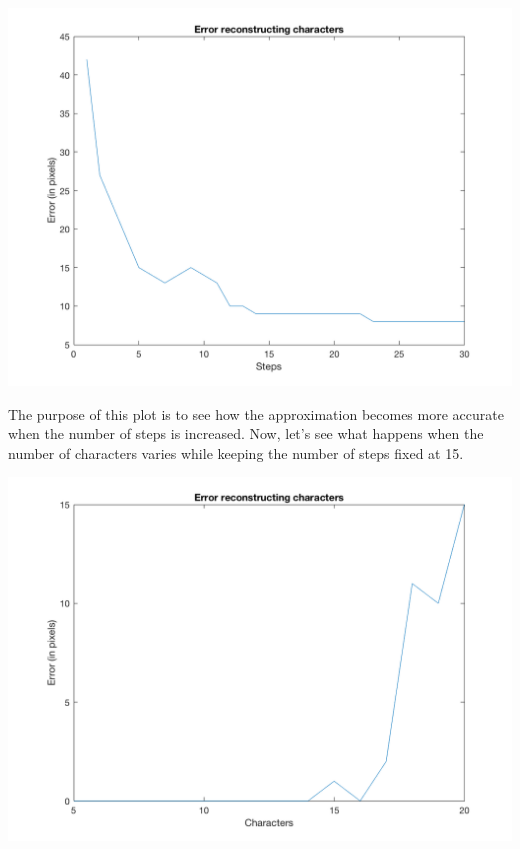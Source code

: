 \documentclass[10pt]{article}
\begin{document}
\begin{multicols}{2}
  \begin{center}
    \includegraphics[height=0.8\linewidth]{img/plot_error1}
  \end{center}

  The purpose of this plot is to see how the approximation becomes more
  accurate when the number of steps is increased. Now, let's see what
  happens when the number of characters varies while keeping the number
  of steps fixed at 15.

  \begin{center}
    \includegraphics[height=0.8\linewidth]{img/plot_error2}
  \end{center}


\end{multicols}
\end{document}
